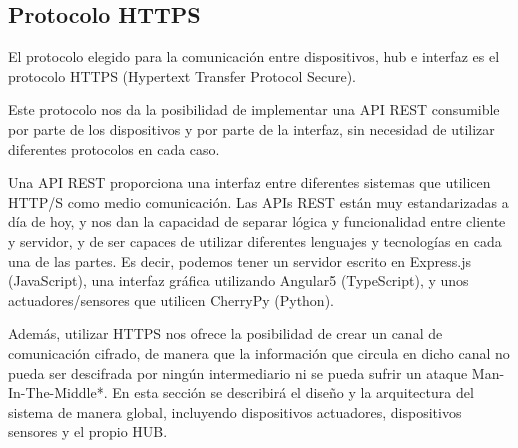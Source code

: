 \subsection{Protocolo HTTPS}
El protocolo elegido para la comunicación entre dispositivos, hub e interfaz es el protocolo HTTPS (Hypertext Transfer Protocol Secure).
\par
Este protocolo nos da la posibilidad de implementar una API REST consumible por parte de los dispositivos y por parte de la interfaz,
sin necesidad de utilizar diferentes protocolos en cada caso.
\par
Una API REST proporciona una interfaz entre diferentes sistemas que utilicen HTTP/S como medio comunicación. Las APIs REST están muy estandarizadas a día de hoy,
 y nos dan la capacidad de separar lógica y funcionalidad entre cliente y servidor, y de ser capaces
de utilizar diferentes lenguajes y tecnologías en cada una de las partes. Es decir, podemos tener un servidor escrito en Express.js (JavaScript), una interfaz 
gráfica utilizando Angular5 (TypeScript), y unos actuadores/sensores que utilicen CherryPy (Python).
\par
Además, utilizar HTTPS nos ofrece la posibilidad de crear un canal de comunicación cifrado, de manera que la información que circula en dicho 
canal no pueda ser descifrada por ningún intermediario ni se pueda sufrir un ataque Man-In-The-Middle*.
En esta sección se describirá el diseño y la arquitectura del sistema de manera global, incluyendo dispositivos actuadores, 
dispositivos sensores y el propio HUB.
